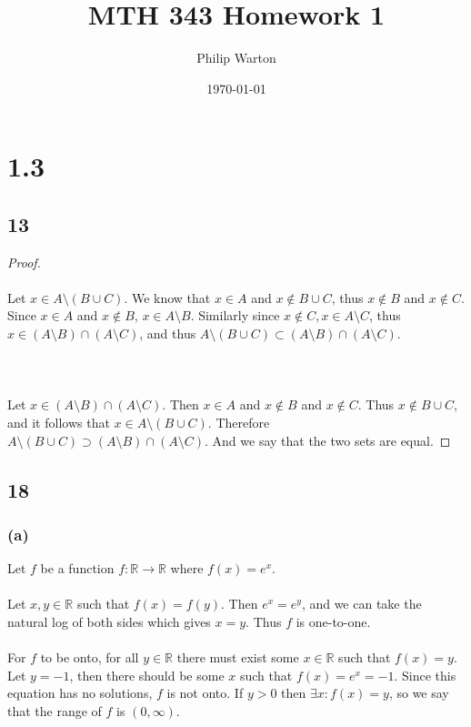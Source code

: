 \documentclass{article}
\begin{document}
\title{MTH 343 Homework 1}
\author{Philip Warton}
\date{\today}
\maketitle

\section*{1.3}
\subsection*{13}
\begin{proof}
    \\\\
    Let $x \in A \setminus (B \cup C)$.
    We know that $x \in A$ and $x \notin B \cup C$, thus $x \notin B$ and $x \notin C$.
    Since $x \in A$ and $x \notin B$, $x \in A \setminus B$.
    Similarly since $x \notin C, x \in A \setminus C$, thus $x \in (A \setminus B) \cap (A \setminus C)$, and thus $A \setminus (B \cup C) \subset (A \setminus B) \cap (A \setminus C)$.
    \\\\
    \\\\
    Let $x \in (A \setminus B) \cap (A \setminus C)$.
    Then $x \in A$ and $x \notin B$ and $x \notin C$. Thus $x \notin B \cup C$, and it follows that $x \in A \setminus (B \cup C)$.
    Therefore $A \setminus (B \cup C) \supset (A \setminus B) \cap (A \setminus C)$.
    And we say that the two sets are equal.
\end{proof}

\subsection*{18}
\subsubsection*{(a)}
Let $f$ be a function $f : \mathbb{R} \rightarrow \mathbb{R}$ where $f(x) = e^x$.
\\\\
Let $x, y \in \mathbb{R}$ such that $f(x) = f(y)$.
Then $e^x = e^y$, and we can take the natural log of both sides which gives $x = y$.
Thus $f$ is one-to-one.
\\\\
For $f$ to be onto, for all $y \in \mathbb{R}$ there must exist some $x \in \mathbb{R}$ such that $f(x) = y$.
Let $y = -1$, then there should be some $x$ such that $f(x) = e^x = -1$.
Since this equation has no solutions, $f$ is not onto.
If $y > 0$ then $\exists x : f(x) = y$, so we say that the range of $f$ is $(0, \infty)$.
\end{document}
